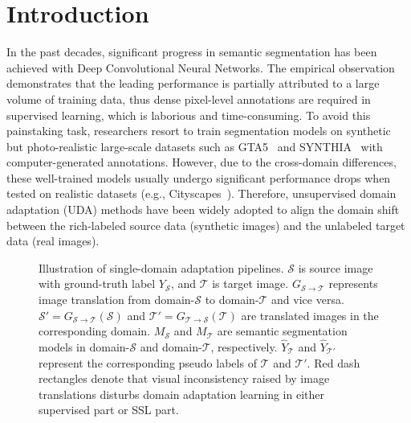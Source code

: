 \documentclass[10pt,twocolumn,letterpaper]{article}
\begin{document}
\section{Introduction \label{section:intro}}
In the past decades, significant progress \cite{zhao2017pspnet, chen2018deeplab,xiao2018unified,WangSCJDZLMTWLX19,YuanCW20,tao2020hierarchical,mohan2020efficientps} in semantic segmentation has been achieved with Deep Convolutional Neural Networks. The empirical observation \cite{raffel2019exploring, xie2019self} demonstrates that the leading performance is partially attributed to a large volume of training data, thus dense pixel-level annotations are required in supervised learning, which is laborious and time-consuming. To avoid this painstaking task, researchers resort to train segmentation models on synthetic but photo-realistic large-scale datasets such as GTA5~\cite{richter2016playing} and SYNTHIA~\cite{ros2016synthia} with computer-generated annotations. However, due to the cross-domain differences, these well-trained models usually undergo significant performance drops when tested on realistic datasets (e.g., Cityscapes~\cite{cordts2016cityscapes}). Therefore, unsupervised domain adaptation (UDA) methods have been widely adopted to align the domain shift between the rich-labeled source data (synthetic images) and the unlabeled target data (real images). 
\begin{figure}[t]
    \centering 
    \vspace{-0.1cm}
  
\caption{Illustration of single-domain adaptation pipelines. $\mathcal{S}$ is source image with ground-truth label $Y_{\mathcal{S}}$, and $\mathcal{T}$ is target image. $G_{\mathcal{S}\rightarrow\mathcal{T}}$ represents image translation from domain-$\mathcal{S}$ to domain-$\mathcal{T}$ and vice versa. $\mathcal{S}' = G_{\mathcal{S}\rightarrow\mathcal{T}}(\mathcal{S})$ and $\mathcal{T}' = G_{\mathcal{T}\rightarrow\mathcal{S}}(\mathcal{T})$ are translated images in the corresponding domain. $M_{\mathcal{S}}$ and $M_{\mathcal{T}}$ are semantic segmentation models in domain-${\mathcal{S}}$ and domain-${\mathcal{T}}$, respectively. $\hat{Y}_{\mathcal{T}}$ and $\hat{Y}_{\mathcal{T}'}$ represent the corresponding pseudo labels of $\mathcal{T}$ and $\mathcal{T}'$. Red dash rectangles denote that visual inconsistency raised by image translations disturbs domain adaptation learning in either supervised part or SSL part.}
    \label{fig:flowchat}
    \vspace{-0.7cm}
\end{figure}
\end{document}
